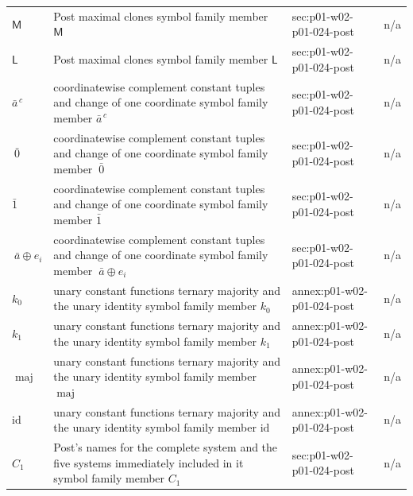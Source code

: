 \begin{longtable}{@{}p{}p{}p{}p{}@{}}
\(\mathsf M\) & Post maximal clones symbol family member \(\mathsf M\) & sec:\allowbreak{}p01-\allowbreak{}w02-\allowbreak{}p01-\allowbreak{}024-\allowbreak{}post & n/a \\
\(\mathsf L\) & Post maximal clones symbol family member \(\mathsf L\) & sec:\allowbreak{}p01-\allowbreak{}w02-\allowbreak{}p01-\allowbreak{}024-\allowbreak{}post & n/a \\
\(\bar a^{\,c}\) & coordinatewise complement constant tuples and change of one coordinate symbol family member \(\bar a^{\,c}\) & sec:\allowbreak{}p01-\allowbreak{}w02-\allowbreak{}p01-\allowbreak{}024-\allowbreak{}post & n/a \\
\(\ \bar0\) & coordinatewise complement constant tuples and change of one coordinate symbol family member \(\ \bar0\) & sec:\allowbreak{}p01-\allowbreak{}w02-\allowbreak{}p01-\allowbreak{}024-\allowbreak{}post & n/a \\
\(\bar1\) & coordinatewise complement constant tuples and change of one coordinate symbol family member \(\bar1\) & sec:\allowbreak{}p01-\allowbreak{}w02-\allowbreak{}p01-\allowbreak{}024-\allowbreak{}post & n/a \\
\(\ \bar a\oplus e_i\) & coordinatewise complement constant tuples and change of one coordinate symbol family member \(\ \bar a\oplus e_i\) & sec:\allowbreak{}p01-\allowbreak{}w02-\allowbreak{}p01-\allowbreak{}024-\allowbreak{}post & n/a \\
\(k_0\) & unary constant functions ternary majority and the unary identity symbol family member \(k_0\) & annex:\allowbreak{}p01-\allowbreak{}w02-\allowbreak{}p01-\allowbreak{}024-\allowbreak{}post & n/a \\
\(k_1\) & unary constant functions ternary majority and the unary identity symbol family member \(k_1\) & annex:\allowbreak{}p01-\allowbreak{}w02-\allowbreak{}p01-\allowbreak{}024-\allowbreak{}post & n/a \\
\(\operatorname{maj}\) & unary constant functions ternary majority and the unary identity symbol family member \(\operatorname{maj}\) & annex:\allowbreak{}p01-\allowbreak{}w02-\allowbreak{}p01-\allowbreak{}024-\allowbreak{}post & n/a \\
\(\mathrm{id}\) & unary constant functions ternary majority and the unary identity symbol family member \(\mathrm{id}\) & annex:\allowbreak{}p01-\allowbreak{}w02-\allowbreak{}p01-\allowbreak{}024-\allowbreak{}post & n/a \\
\(C_1\) & Post's names for the complete system and the five systems immediately included in it symbol family member \(C_1\) & sec:\allowbreak{}p01-\allowbreak{}w02-\allowbreak{}p01-\allowbreak{}024-\allowbreak{}post & n/a \\

\end{longtable}
